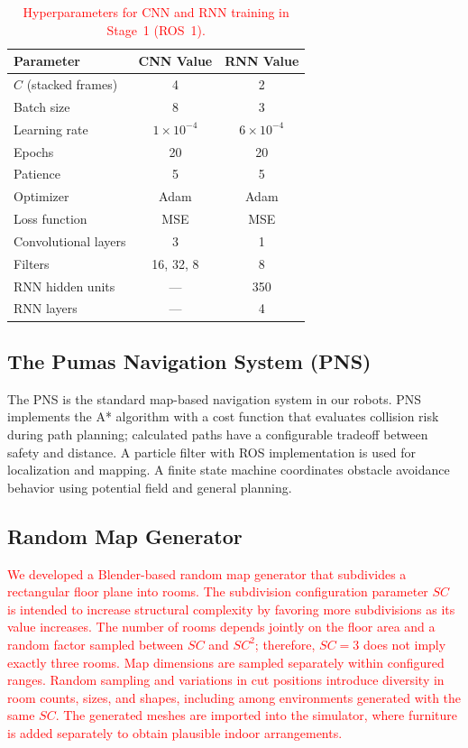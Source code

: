 \documentclass[robotics,article,submit,pdftex,moreauthors]{Definitions/mdpi}
\begin{document}
\begin{table}[htbp]
\centering
\caption{\textcolor{red}{Hyperparameters for CNN and RNN training in Stage~1 (ROS~1).}}
\label{tab:hyperparams}
\vspace{2.5pt}
\begin{tabular}{|l|c|c|}
\hline
\textbf{Parameter} & \textbf{CNN Value} & \textbf{RNN Value} \\
\hline
$C$ (stacked frames) & 4 & 2 \\
Batch size & 8 & 3 \\
Learning rate & $1 \times 10^{-4}$ & $6 \times 10^{-4}$ \\
Epochs & 20 & 20 \\
Patience & 5 & 5 \\
Optimizer & Adam & Adam \\
Loss function & MSE & MSE \\
Convolutional layers & 3 & 1 \\
Filters & 16, 32, 8 & 8 \\
RNN hidden units & — & 350 \\
RNN layers & — & 4 \\
\hline
\end{tabular}
\end{table}

\subsection{The Pumas Navigation System (PNS)}\label{subsec:pumas_nav}

The PNS \citep{contreras2025b} is the standard map-based navigation system in our robots. PNS implements the A* algorithm with a cost function that evaluates collision risk during path planning; calculated paths have a configurable tradeoff between safety and distance. A particle filter with ROS implementation is used for localization and mapping. A finite state machine coordinates obstacle avoidance behavior using potential field and general planning.

\subsection{Random Map Generator} \label{subsec:random_map}

\textcolor{red}{We developed a Blender-based random map generator that subdivides a rectangular floor plane into rooms. The subdivision configuration parameter $SC$ is intended to increase structural complexity by favoring more subdivisions as its value increases. The number of rooms depends jointly on the floor area and a random factor sampled between $SC$ and $SC^2$; therefore, $SC=3$ does not imply exactly three rooms. Map dimensions are sampled separately within configured ranges. Random sampling and variations in cut positions introduce diversity in room counts, sizes, and shapes, including among environments generated with the same $SC$. The generated meshes are imported into the simulator, where furniture is added separately to obtain plausible indoor arrangements.}
\end{document}

